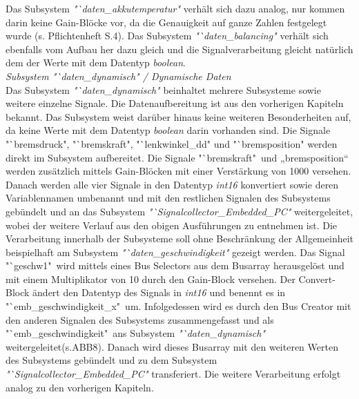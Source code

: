 \documentclass[fontsize = 12pt, paper = a4]{scrreprt}
\begin{document}
\newpage

Das Subsystem \textit{"`daten\_akkutemperatur"} verhält sich dazu analog, nur kommen darin keine Gain-Blöcke vor, da die Genauigkeit auf ganze Zahlen festgelegt wurde (s. Pflichtenheft S.4).
Das Subsystem \textit{"`daten\_balancing"} verhält sich ebenfalls vom Aufbau her dazu gleich und die Signalverarbeitung gleicht natürlich dem der Werte mit dem Datentyp \textit{boolean}. \\


\textit{Subsystem "`daten\_dynamisch" / Dynamische Daten} \\

Das Subsystem \textit{"`daten\_dynamisch"} beinhaltet mehrere Subsysteme sowie weitere einzelne Signale. Die Datenaufbereitung ist aus den vorherigen Kapiteln bekannt. Das Subsystem weist darüber hinaus keine weiteren Besonderheiten auf, da keine Werte mit dem Datentyp \textit{boolean} darin vorhanden sind. Die Signale "`bremsdruck", "`bremskraft", "`lenkwinkel\_dd"          und "`bremsposition" werden direkt im Subsystem aufbereitet. Die Signale "`bremskraft"\ und „bremsposition“ werden zusätzlich mittels Gain-Blöcken mit einer Verstärkung von 1000 versehen. Danach werden alle vier Signale in den Datentyp \textit{int16} konvertiert sowie deren Variablennamen  umbenannt und mit den restlichen Signalen des Subsystems gebündelt und an das Subsystem \textit{"`Signalcollector\_Embedded\_PC"} weitergeleitet, wobei der weitere Verlauf aus den obigen Ausführungen zu entnehmen ist. Die Verarbeitung innerhalb der Subsysteme soll ohne Beschränkung der Allgemeinheit beispielhaft am Subsystem \textit{"`daten\_geschwindigkeit"} gezeigt werden. Das Signal "`geschw1"\ wird mittels eines Bus Selectors aus dem Busarray herausgelöst und mit einem Multiplikator von 10  durch den Gain-Block versehen. Der Convert-Block ändert den Datentyp des Signals in \textit{int16} und benennt es in "`emb\_geschwindigkeit\_x"\ um. Infolgedessen wird es durch den Bus Creator mit den anderen Signalen des Subsystems zusammengefasst und als "`emb\_geschwindigkeit"\ ans Subsystem \textit{"`daten\_dynamisch"} weitergeleitet(s.ABB8). Danach wird dieses Busarray mit den weiteren Werten des Subsystems gebündelt und zu dem Subsystem \textit{"`Signalcollector\_Embedded\_PC"} transferiert. Die weitere Verarbeitung erfolgt analog zu den vorherigen Kapiteln.
\end{document}

